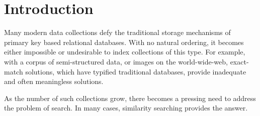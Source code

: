 \chapter{Introduction}\label{ch:introduction}
%
Many modern data collections defy the traditional storage mechanisms of primary key based relational databases. With no natural ordering, it becomes either impossible or undesirable to index collections of this type.  For example, with a corpus of semi-structured data, or images on the world-wide-web, exact-match solutions, which have typified traditional databases, provide inadequate and often meaningless solutions.

As the number of such collections grow, there becomes a pressing need to address the problem of search.  In many cases, similarity searching provides the answer. 


